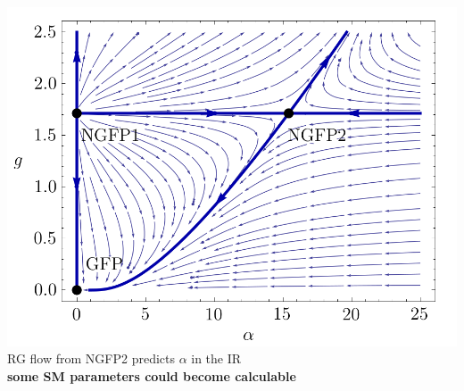 \documentclass[]{beamer}  %
\begin{document}
\begin{frame}
\begin{columns}[T]
\begin{column}{.5\textwidth}
\begin{center}
        \includegraphics[scale=0.17]{qed_qeg.png}\\[5pt]
        RG flow from NGFP2 predicts $\alpha$ in the IR\\[10pt]
        \textbf{some SM parameters could become calculable}
      \end{center}
    \end{column}
  \end{columns}



\end{frame}


\end{document}
